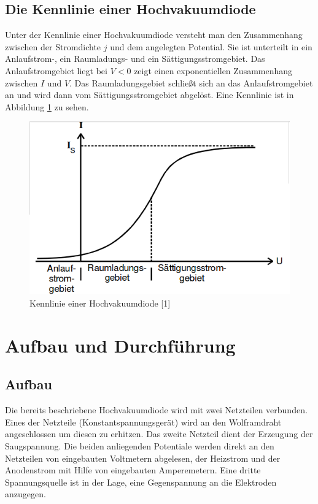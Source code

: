 \documentclass[11pt,ngerman,a4paper]{article}
\begin{document}
\subsection{Die Kennlinie einer Hochvakuumdiode}
Unter der Kennlinie einer Hochvakuumdiode versteht man den Zusammenhang zwischen der Stromdichte $j$ und dem angelegten Potential. Sie ist unterteilt in ein Anlaufstrom-, ein Raumladungs- und ein Sättigungsstromgebiet. Das Anlaufstromgebiet liegt bei $V < 0$ zeigt einen exponentiellen Zusammenhang zwischen $I$ und $V$. Das Raumladungsgebiet schließt sich an das Anlaufstromgebiet an und wird dann vom Sättigungsstromgebiet abgelöst. Eine Kennlinie ist in Abbildung \ref{funktion3} zu sehen.
\begin{figure}[H]
\centering
\includegraphics[scale=0.5]{abb3.png}
\caption{Kennlinie einer Hochvakuumdiode [1]}
\label{funktion3}
\end{figure}
\section{Aufbau und Durchführung}
\subsection{Aufbau}
Die bereits beschriebene Hochvakuumdiode wird mit zwei Netzteilen verbunden. Eines der Netzteile (Konstantspannungsgerät) wird an den Wolframdraht angeschlossen um diesen zu erhitzen. Das zweite Netzteil dient der Erzeugung der Saugspannung. Die beiden anliegenden Potentiale werden direkt an den Netzteilen von eingebauten Voltmetern abgelesen, der Heizstrom und der Anodenstrom mit Hilfe von eingebauten Amperemetern. Eine dritte Spannungsquelle ist in der Lage, eine Gegenspannung an die Elektroden anzugegen.
\end{document}
